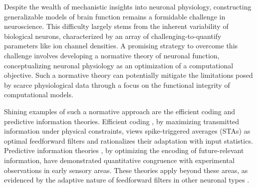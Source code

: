 \documentclass[9pt,twocolumn,twoside]{pnas-new}
\begin{document}

\maketitle
\thispagestyle{firststyle}


Despite the wealth of mechanistic insights into neuronal physiology, constructing generalizable models of brain function remains a formidable challenge in neuroscience. This difficulty largely stems from the inherent variability of biological neurons, characterized by an array of challenging-to-quantify parameters like ion channel densities. A promising strategy to overcome this challenge involves developing a normative theory of neuronal function, conceptualizing neuronal physiology as an optimization of a computational objective. Such a normative theory can potentially mitigate the limitations posed by scarce physiological data through a focus on the functional integrity of computational models.

Shining examples of such a normative approach are the efficient coding and predictive information theories. Efficient coding \citep{barlow2001redundancy,srinivasan1982predictive,atick1992could,van1992theoretical,simoncelli2001natural,rao1999predictive,jun2022efficient}, by maximizing transmitted information under physical constraints, views spike-triggered averages (STAs) as optimal feedforward filters and rationalizes their adaptation with input statistics. Predictive information theories \citep{palmer2015predictive,rust2021remembering,wang2021maximally,tishby2000information,chalk2018toward}, by optimizing the encoding of future-relevant information, have demonstrated quantitative congruence with experimental observations in early sensory areas. These theories apply beyond these areas, as evidenced by the adaptive nature of feedforward filters in other neuronal types \citep{bryant1976spike,mainen1995reliability}.
\end{document}
